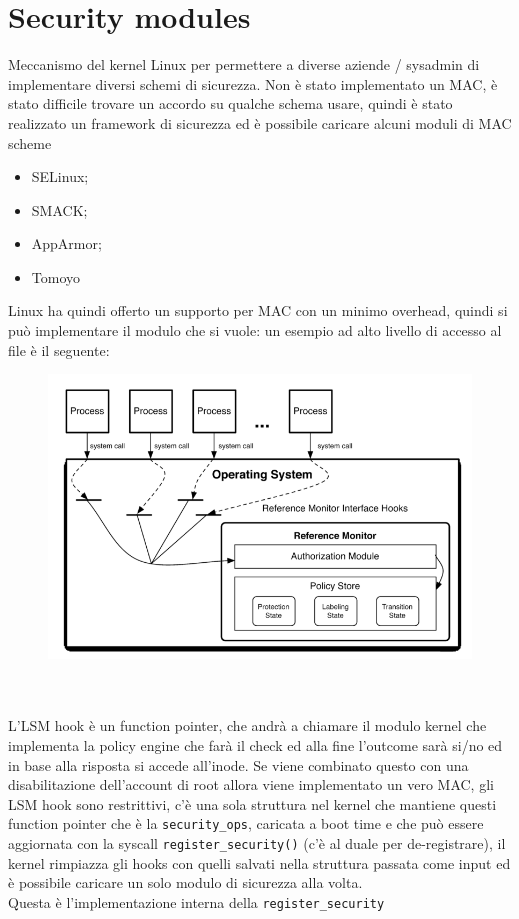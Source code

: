 \documentclass[12pt, oneside]{extbook} %
\begin{document}
\section{Security modules}
Meccanismo del kernel Linux per permettere a diverse aziende / sysadmin di implementare diversi schemi di sicurezza. Non è stato implementato un MAC, è stato difficile trovare un accordo su qualche schema usare, quindi è stato realizzato un framework di sicurezza ed è possibile caricare alcuni moduli di MAC scheme
\begin{itemize}
\item SELinux;
\item SMACK;
\item AppArmor;
\item Tomoyo
\end{itemize}
Linux ha quindi offerto un supporto per MAC con un minimo overhead, quindi si può implementare il modulo che si vuole: un esempio ad alto livello di accesso al file è il seguente:\\
\begin{figure}[!h]
	\includegraphics[scale=0.3]{immagini/ref_monitor.png}
\end{figure}\\\\
L'LSM hook è un function pointer, che andrà a chiamare il modulo kernel che implementa la policy engine che farà il check ed alla fine l'outcome sarà si/no ed in base alla risposta si accede all'inode. Se viene combinato questo con una disabilitazione dell'account di root allora viene implementato un vero MAC, gli LSM hook sono restrittivi, c'è una sola struttura nel kernel che mantiene questi function pointer che è la \texttt{security\_ops}, caricata a boot time e che può essere aggiornata con la syscall \texttt{register\_security()} (c'è al duale per de-registrare), il kernel rimpiazza gli hooks con quelli salvati nella struttura passata come input ed è possibile caricare un solo modulo di sicurezza alla volta.\\Questa è l'implementazione interna della \texttt{register\_security}
\end{document}
